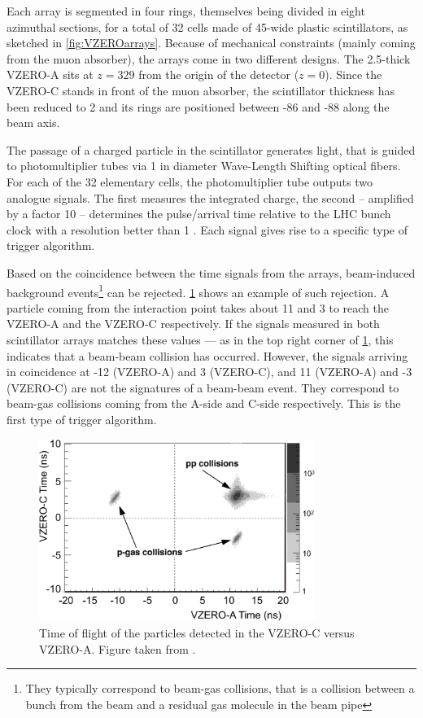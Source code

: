 Each array is segmented in four rings, themselves being divided in eight azimuthal sections, for a total of 32 cells made of 45\textdegree-wide plastic scintillators, as sketched in \fig\ref{fig:VZEROarrays}. Because of mechanical constraints (mainly coming from the muon absorber), the arrays come in two different designs. The 2.5-\cm thick VZERO-A sits at $z = 329$ \cm from the origin of the detector ($z = 0$). Since the VZERO-C stands in front of the muon absorber, the scintillator thickness has been reduced to 2 \cm and its rings are positioned between -86 and -88 \cm along the beam axis.

The passage of a charged particle in the scintillator generates light, that is guided to photomultiplier tubes via 1 \mm in diameter Wave-Length Shifting optical fibers. For each of the 32 elementary cells, the photomultiplier tube outputs two analogue signals. The first measures the integrated charge, the second -- amplified by a factor 10 -- determines the pulse/arrival time relative to the LHC bunch clock with a resolution better than 1 \nsec. Each signal gives rise to a specific type of trigger algorithm. 

Based on the coincidence between the time signals from the arrays, beam-induced background events\footnote{They typically correspond to beam-gas collisions, that is a collision between a bunch from the beam and a residual gas molecule in the beam pipe} can be rejected. \Fig\ref{fig:VZERObeamgas} shows an example of such rejection. A particle coming from the interaction point takes about 11 \nsec and 3 \nsec to reach the VZERO-A and the VZERO-C respectively. If the signals measured in both scintillator arrays matches these values --- as in the top right corner of \fig\ref{fig:VZERObeamgas}, this indicates that a beam-beam collision has occurred. However, the signals arriving in coincidence at -12 \nsec (VZERO-A) and 3 \nsec (VZERO-C), and 11 \nsec (VZERO-A) and -3 \nsec (VZERO-C) are not the signatures of a beam-beam event. They correspond to beam-gas collisions coming from the A-side and C-side respectively. This is the first type of trigger algorithm.

\begin{figure}[t]
	\centering
	\includegraphics[width=0.8\textwidth]{Figs/Chapter3/Fig6_2-4228.png}
	\caption{Time of flight of the particles detected in the VZERO-C versus VZERO-A. Figure taken from \cite{alicecollaborationPerformanceALICEVZERO2013}.}
	\label{fig:VZERObeamgas}
\end{figure}

